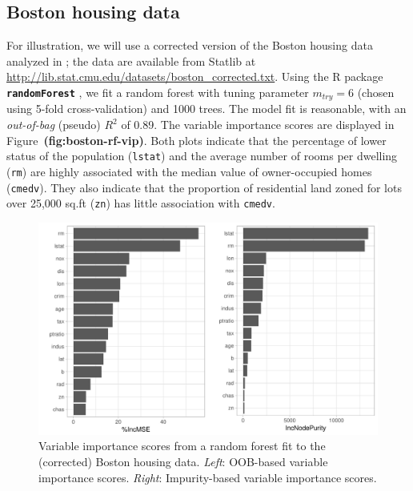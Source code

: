 \documentclass[12pt]{article}
\newcommand{\pkg}[1]{\texorpdfstring%
{{\normalfont\fontseries{b}\selectfont #1}}%
{#1}}
\def\code#1{\texttt{#1}}
\def\pkg#1{\textbf{\texttt{#1}}}
\def\ref#1{\textbf{(#1)}}
\begin{document}
\subsection{Boston housing data}

For illustration, we will use a corrected version of the Boston housing data analyzed in \citet{harrison-1978-hedonic}; the data are available from Statlib at \url{http://lib.stat.cmu.edu/datasets/boston_corrected.txt}. Using the R package \pkg{randomForest} \citep{randomForest-pkg}, we fit a random forest with tuning parameter $m_{try} = 6$ (chosen using 5-fold cross-validation) and 1000 trees. The model fit is reasonable, with an \textit{out-of-bag} (pseudo) $R^2$ of 0.89. The variable importance scores are displayed in Figure~\ref{fig:boston-rf-vip}. Both plots indicate that the percentage of lower status of the population (\code{lstat}) and the average number of rooms per dwelling (\code{rm}) are highly associated with the median value of owner-occupied homes (\code{cmedv}). They also indicate that the proportion of residential land zoned for lots over 25,000 sq.ft (\code{zn}) has little association with \code{cmedv}.
\begin{figure}[!htb]
  \centering
  \includegraphics[width=1.0\textwidth]{boston-rf-vip}
  \caption{Variable importance scores from a random forest fit to the (corrected) Boston housing data. \textit{Left}: OOB-based variable importance scores. \textit{Right}: Impurity-based variable importance scores. \label{fig:boston-rf-vip}}
\end{figure}
\end{document}

